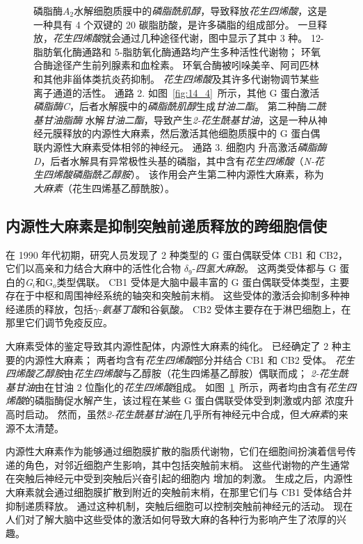 \begin{figure}[htbp]
{		磷脂酶$A_2$水解细胞质膜中的\textit{磷脂酰肌醇}，导致释放\textit{花生四烯酸}，这是一种具有 4 个双键的 20 碳脂肪酸，是许多磷脂的组成部分。
		一旦释放，\textit{花生四烯酸}就会通过几种途径代谢，图中显示了其中 3 种。
		12-脂肪氧化酶通路和 5-脂肪氧化酶通路均产生多种活性代谢物；
		环氧合酶途径产生前列腺素和血栓素。
		环氧合酶被吲哚美辛、阿司匹林和其他非甾体类抗炎药抑制。
		\textit{花生四烯酸}及其许多代谢物调节某些离子通道的活性。
		通路 2. 如图~\ref{fig:14_4}~所示，其他 G 蛋白激活\textit{磷脂酶C}，后者水解膜中的\textit{磷脂酰肌醇}生成\textit{甘油二酯}。
		第二种酶\textit{二酰基甘油脂酶} 水解\textit{甘油二酯}，导致产生\textit{2-花生酰基甘油}，这是一种从神经元膜释放的内源性大麻素，然后激活其他细胞质膜中的 G 蛋白偶联内源性大麻素受体相邻的神经元。
		通路 3. 细胞内  升高激活\textit{磷脂酶 D}，后者水解具有异常极性头基的磷脂，其中含有\textit{花生四烯酸}（\textit{N-花生四烯酸磷脂酰乙醇胺}）。
		该作用会产生第二种内源性大麻素，称为\textit{大麻素}（花生四烯基乙醇酰胺）。}
	\label{fig:14_6}
\end{figure}



\subsection{内源性大麻素是抑制突触前递质释放的跨细胞信使}

在 1990 年代初期，研究人员发现了 2 种类型的 G 蛋白偶联受体 CB1 和 CB2，它们以高亲和力结合大麻中的活性化合物 $\delta_9$-\textit{四氢大麻酚}。
这两类受体都与 G 蛋白的\textit{G$_i $}和G$_o$类型偶联。
CB1 受体是大脑中最丰富的 G 蛋白偶联受体类型，主要存在于中枢和周围神经系统的轴突和突触前末梢。
这些受体的激活会抑制多种神经递质的释放，包括\textit{$\gamma$-氨基丁酸}和谷氨酸。
CB2 受体主要存在于淋巴细胞上，在那里它们调节免疫反应。


大麻素受体的鉴定导致其内源性配体，内源性大麻素的纯化。
已经确定了 2 种主要的内源性大麻素；
两者均含有\textit{花生四烯酸}部分并结合 CB1 和 CB2 受体。 
\textit{花生四烯酸乙醇胺}由\textit{花生四烯酸}与乙醇胺（花生四烯基乙醇胺）偶联而成；
\textit{2-花生酰基甘油}由在甘油 2 位酯化的\textit{花生四烯酸}组成。
如图~\ref{fig:14_6}~所示，两者均由含有\textit{花生四烯酸}的磷脂酶促水解产生，该过程在某些 G 蛋白偶联受体受到刺激或内部  浓度升高时启动。
然而，虽然\textit{2-花生酰基甘油}在几乎所有神经元中合成，但\textit{大麻素}的来源不太清楚。


内源性大麻素作为能够通过细胞膜扩散的脂质代谢物，它们在细胞间扮演着信号传递的角色，对邻近细胞产生影响，其中包括突触前末梢。
这些代谢物的产生通常在突触后神经元中受到突触后兴奋引起的细胞内  增加的刺激。
生成之后，内源性大麻素就会通过细胞膜扩散到附近的突触前末梢，在那里它们与 CB1 受体结合并抑制递质释放。
通过这种机制，突触后细胞可以控制突触前神经元的活动。 
现在人们对了解大脑中这些受体的激活如何导致大麻的各种行为影响产生了浓厚的兴趣。



